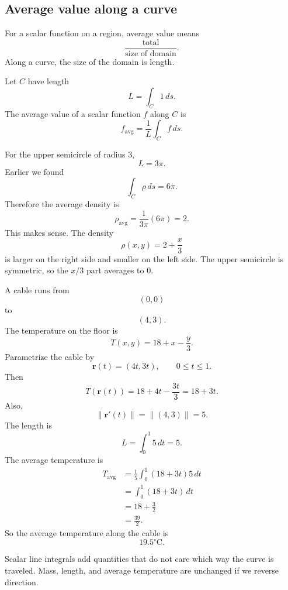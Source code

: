\subsection{Average value along a curve}

For a scalar function on a region, average value means
\[
    \frac{\text{total}}{\text{size of domain}}.
\]
Along a curve, the size of the domain is length.

\begin{definition}
Let \(C\) have length
\[
    L=\int_C 1\,ds.
\]
The average value of a scalar function \(f\) along \(C\) is
\[
\boxed{
    f_{\mathrm{avg}}
    =
    \frac{1}{L}\int_C f\,ds.
}
\]
\end{definition}

\begin{example}
For the upper semicircle of radius \(3\),
\[
    L=3\pi.
\]
Earlier we found
\[
    \int_C \rho\,ds=6\pi.
\]
Therefore the average density is
\[
    \rho_{\mathrm{avg}}
    =
    \frac{1}{3\pi}(6\pi)
    =
    2.
\]
This makes sense.  The density
\[
    \rho(x,y)=2+\frac{x}{3}
\]
is larger on the right side and smaller on the left side.  The upper semicircle is
symmetric, so the \(x/3\) part averages to \(0\).
\end{example}

\begin{example}
A cable runs from
\[
    (0,0)
\]
to
\[
    (4,3).
\]
The temperature on the floor is
\[
    T(x,y)=18+x-\frac{y}{3}.
\]
Parametrize the cable by
\[
    \mathbf r(t)=(4t,3t),
    \qquad 0\le t\le1.
\]
Then
\[
    T(\mathbf r(t))
    =
    18+4t-\frac{3t}{3}
    =
    18+3t.
\]
Also,
\[
    \|\mathbf r'(t)\|=\|(4,3)\|=5.
\]
The length is
\[
    L=\int_0^1 5\,dt=5.
\]
The average temperature is
\[
\begin{aligned}
T_{\mathrm{avg}}
&=
\frac{1}{5}\int_0^1 (18+3t)5\,dt\\
&=
\int_0^1(18+3t)\,dt\\
&=
18+\frac32\\
&=
\frac{39}{2}.
\end{aligned}
\]
So the average temperature along the cable is
\[
\boxed{
    19.5^\circ\text{C}.
}
\]
\end{example}

Scalar line integrals add quantities that do not care which way the curve is traveled.
Mass, length, and average temperature are unchanged if we reverse direction.

